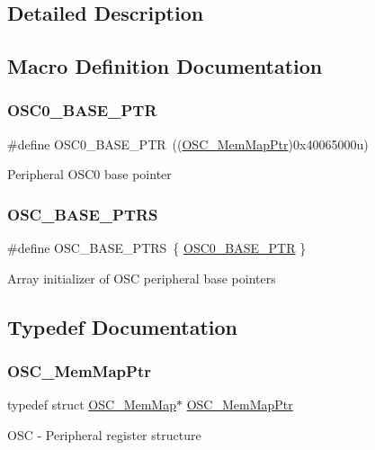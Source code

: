 \subsection{Detailed Description}


\subsection{Macro Definition Documentation}
\mbox{\label{group___o_s_c___peripheral_gaab1618c69a91b2e5d3385139b5b566f0}} 
\subsubsection{\texorpdfstring{O\+S\+C0\+\_\+\+B\+A\+S\+E\+\_\+\+P\+TR}{OSC0\_BASE\_PTR}}
{\footnotesize\ttfamily \#define O\+S\+C0\+\_\+\+B\+A\+S\+E\+\_\+\+P\+TR~((\hyperlink{group___o_s_c___peripheral_gaaa685163f549fdf24c28ec9b400310b5}{O\+S\+C\+\_\+\+Mem\+Map\+Ptr})0x40065000u)}

Peripheral O\+S\+C0 base pointer \mbox{\label{group___o_s_c___peripheral_ga46f69fcb9d660e18b5cbf51adbbcec78}} 
\subsubsection{\texorpdfstring{O\+S\+C\+\_\+\+B\+A\+S\+E\+\_\+\+P\+T\+RS}{OSC\_BASE\_PTRS}}
{\footnotesize\ttfamily \#define O\+S\+C\+\_\+\+B\+A\+S\+E\+\_\+\+P\+T\+RS~\{ \hyperlink{group___o_s_c___peripheral_gaab1618c69a91b2e5d3385139b5b566f0}{O\+S\+C0\+\_\+\+B\+A\+S\+E\+\_\+\+P\+TR} \}}

Array initializer of O\+SC peripheral base pointers 

\subsection{Typedef Documentation}
\mbox{\label{group___o_s_c___peripheral_gaaa685163f549fdf24c28ec9b400310b5}} 
\subsubsection{\texorpdfstring{O\+S\+C\+\_\+\+Mem\+Map\+Ptr}{OSC\_MemMapPtr}}
{\footnotesize\ttfamily typedef struct \hyperlink{struct_o_s_c___mem_map}{O\+S\+C\+\_\+\+Mem\+Map}$\ast$ \hyperlink{group___o_s_c___peripheral_gaaa685163f549fdf24c28ec9b400310b5}{O\+S\+C\+\_\+\+Mem\+Map\+Ptr}}

O\+SC -\/ Peripheral register structure 